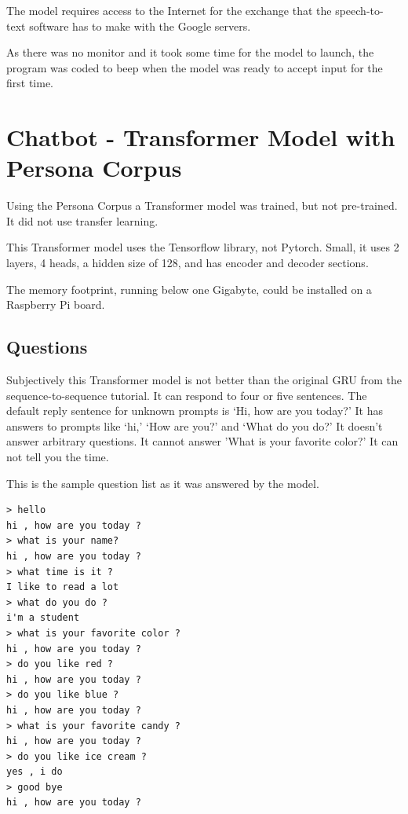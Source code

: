 The model requires access to the Internet for the exchange that the speech-to-text software has to make with the Google servers.

As there was no monitor and it took some time for the model to launch, the program was coded to beep when the model was ready to accept input for the first time.

\section{Chatbot - Transformer Model with Persona Corpus}
\label{transformer-persona-corpus}
Using the Persona Corpus a Transformer model was trained, but not pre-trained. It did not use transfer learning. %

This Transformer model uses the Tensorflow library, not Pytorch. Small, it uses 2 layers, 4 heads, a hidden size of 128, and has encoder and decoder sections.

The memory footprint, running below one Gigabyte, could be installed on a Raspberry Pi board. %


\subsection{Questions}
Subjectively this Transformer model is not better than the original GRU from the sequence-to-sequence tutorial. It can respond to four or five sentences. The default reply sentence for unknown prompts is `Hi, how are you today?' It has answers to prompts like `hi,' `How are you?' and `What do you do?' It doesn't answer arbitrary questions. It cannot answer 'What is your favorite color?' It can not tell you the time. 

This is the sample question list as it was answered by the model.

\begin{verbatim}
> hello
hi , how are you today ?
> what is your name?
hi , how are you today ?
> what time is it ?
I like to read a lot
> what do you do ?
i'm a student
> what is your favorite color ?
hi , how are you today ?
> do you like red ?
hi , how are you today ?
> do you like blue ?
hi , how are you today ?
> what is your favorite candy ?
hi , how are you today ?
> do you like ice cream ?
yes , i do 
> good bye
hi , how are you today ?
\end{verbatim}

